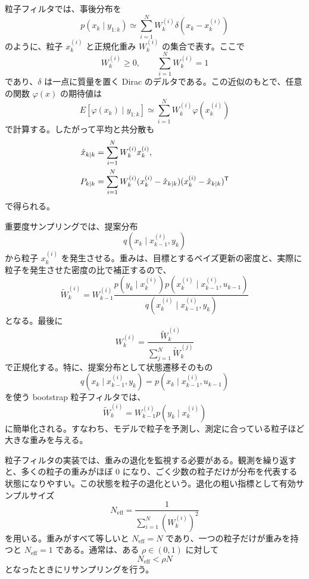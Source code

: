 粒子フィルタでは、事後分布を
\begin{equation}
  p(x_k\mid y_{1:k})
  \simeq
  \sum_{i=1}^{N}W_k^{(i)}\delta(x_k-x_k^{(i)})
\end{equation}
のように、粒子 $x_k^{(i)}$ と正規化重み $W_k^{(i)}$ の集合で表す。ここで
\begin{equation}
  W_k^{(i)}\ge0,\qquad
  \sum_{i=1}^{N}W_k^{(i)}=1
\end{equation}
であり、$\delta$ は一点に質量を置く Dirac のデルタである。この近似のもとで、任意の関数 $\varphi(x)$ の期待値は
\begin{equation}
  E[\varphi(x_k)\mid y_{1:k}]
  \simeq
  \sum_{i=1}^{N}W_k^{(i)}\varphi(x_k^{(i)})
\end{equation}
で計算する。したがって平均と共分散も
\begin{align}
  \hat{x}_{k|k}
  &=\sum_{i=1}^{N}W_k^{(i)}x_k^{(i)},\\
  P_{k|k}
  &=\sum_{i=1}^{N}W_k^{(i)}
  (x_k^{(i)}-\hat{x}_{k|k})(x_k^{(i)}-\hat{x}_{k|k})^{\mathsf{T}}
\end{align}
で得られる。

重要度サンプリングでは、提案分布
\begin{equation}
  q(x_k\mid x_{k-1}^{(i)},y_k)
\end{equation}
から粒子 $x_k^{(i)}$ を発生させる。重みは、目標とするベイズ更新の密度と、実際に粒子を発生させた密度の比で補正するので、
\begin{equation}
  \tilde{W}_k^{(i)}
  =
  W_{k-1}^{(i)}
  \frac{
    p(y_k\mid x_k^{(i)})
    p(x_k^{(i)}\mid x_{k-1}^{(i)},u_{k-1})
  }{
    q(x_k^{(i)}\mid x_{k-1}^{(i)},y_k)
  }
\end{equation}
となる。最後に
\begin{equation}
  W_k^{(i)}
  =
  \frac{\tilde{W}_k^{(i)}}
       {\sum_{j=1}^{N}\tilde{W}_k^{(j)}}
\end{equation}
で正規化する。特に、提案分布として状態遷移そのもの
\begin{equation}
  q(x_k\mid x_{k-1}^{(i)},y_k)
  =
  p(x_k\mid x_{k-1}^{(i)},u_{k-1})
\end{equation}
を使う bootstrap 粒子フィルタでは、
\begin{equation}
  \tilde{W}_k^{(i)}
  =
  W_{k-1}^{(i)}p(y_k\mid x_k^{(i)})
\end{equation}
に簡単化される。すなわち、モデルで粒子を予測し、測定に合っている粒子ほど大きな重みを与える。

粒子フィルタの実装では、重みの退化を監視する必要がある。観測を繰り返すと、多くの粒子の重みがほぼ 0 になり、ごく少数の粒子だけが分布を代表する状態になりやすい。この状態を粒子の退化という。退化の粗い指標として有効サンプルサイズ
\begin{equation}
  N_\text{eff}
  =
  \frac{1}{\sum_{i=1}^{N}(W_k^{(i)})^2}
\end{equation}
を用いる。重みがすべて等しいと $N_\text{eff}=N$ であり、一つの粒子だけが重みを持つと $N_\text{eff}=1$ である。通常は、ある $\rho\in(0,1)$ に対して
\begin{equation}
  N_\text{eff}<\rho N
\end{equation}
となったときにリサンプリングを行う。


